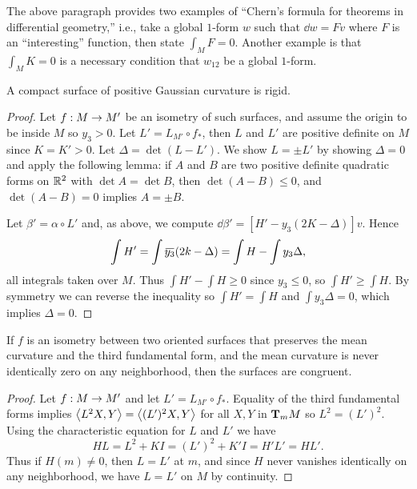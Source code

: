 \documentclass[../main]{subfiles}
\begin{document}
The above paragraph provides two examples of ``Chern's formula for theorems in differential geometry,'' i.e., take a global $1$-form $w$ such that $\dd w=Fv$ where $F$ is an ``interesting'' function, then state $\int_MF=0$. Another example is that $\int_M K=0$ is a necessary condition that $w_{12}$ be a global $1$-form.



\begin{theorem} \label{thm:ch8.5.2}
\label{thm:stuff}
A compact surface of positive Gaussian curvature is rigid.
\end{theorem}

\begin{proof}
Let $f: M \functionMaps M'$ be an isometry of such surfaces, and assume the origin to be inside $M$ so $y_3>0$. Let $L'=L_{M'}\circ f_{*}$, then $L$ and $L'$ are positive definite on $M$ since $K=K'>0$. Let $\Delta=\det(L-L')$. We show $L=\pm L'$ by showing $\Delta=0$ and apply the following lemma: if $A$ and $B$ are two positive definite quadratic forms on $\bR^2$ with $\det A=\det B$, then $\det(A-B)\leq 0$, and $\det(A-B)=0$ implies $A=\pm B$.

Let $\beta'=\alpha \circ L'$ and, as above, we compute $\dd\beta'=[H'-y_3(2K-\Delta)]v$. Hence \[\int H'=\int\xoverline{y_3}(2k-\Delta)=\int H-\int y_3\Delta,\] all integrals taken over $M$. Thus $\int H'-\int H \geq 0$ since $y_3 \leq 0$, so $\int H' \geq \int H$. By symmetry we can reverse the inequality so $\int H'=\int H$ and $\int y_3 \Delta=0$, which implies $\Delta=0$.
\end{proof}



\begin{theorem} \label{thm:ch8.5.3}
If $f$ is an isometry between two oriented surfaces that preserves the mean curvature and the third fundamental form, and the mean curvature is never identically zero on any neighborhood, then the surfaces are congruent.
\end{theorem}

\begin{proof}
Let $f: M \functionMaps M'$ and let $L'=L_{M'} \circ f_*$. Equality of the third fundamental forms implies $\ip{L^2X}{Y}=\ip{(L')^2 X}{Y}$ for all $X, Y$ in $\ts{M}{m}$ so $L^2=(L')^2$. Using the characteristic equation for $L$ and $L'$ we have \[HL=L^2+K I=(L')^2+K'I=H' L'=H L'.\] Thus if $H(m)\neq 0$, then $L=L'$ at $m$, and since $H$ never vanishes identically on any neighborhood, we have $L=L'$ on $M$ by continuity.
\end{proof}
\end{document}
